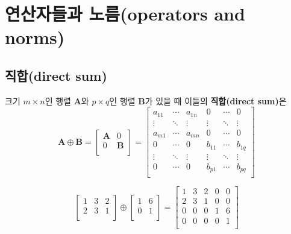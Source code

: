 \documentclass[b5paper,]{scrbook}
\theoremstyle{plain}
\theoremstyle{definition}
\numberwithin{equation}{section}
\let\BeginKnitrBlock\begin \let\EndKnitrBlock\end
\begin{document}
\section{연산자들과 노름(operators and
norms)}\label{-operators-and-norms}

\subsection{직합(direct sum)}\label{direct-sum}

\BeginKnitrBlock{definition}[직합]
\protect\hypertarget{def:unnamed-chunk-2}{}{\label{def:unnamed-chunk-2}
{} }크기 \(m \times n\)인 행렬 \(\mathbf{A}\)와
\(p\times q\)인 행렬 \(\mathbf{B}\)가 있을 때 이들의 \textbf{직합(direct
sum)}은 \[\mathbf{A}\oplus\mathbf{B}=
\begin{bmatrix}
\mathbf{A} & 0\\
0 & \mathbf{B}\\
\end{bmatrix}
=
\begin{bmatrix}
a_{11} & \cdots & a_{1n} & 0 & \cdots & 0 \\
\vdots & \ddots & \vdots & \vdots & \ddots & \vdots \\
a_{m1} & \cdots & a_{mn} & 0 & \cdots & 0 \\
0 & \cdots & 0 & b_{11} & \cdots & b_{1q} \\
\vdots & \ddots & \vdots & \vdots & \ddots & \vdots \\
0 & \cdots & 0 & b_{p1} & \cdots & b_{pq} \\
\end{bmatrix}
\]
\EndKnitrBlock{definition}

\BeginKnitrBlock{example}[직합의 예]
\protect\hypertarget{exm:unnamed-chunk-3}{}{\label{exm:unnamed-chunk-3}
{} }\[
\begin{bmatrix}
1 & 3 & 2\\
2 & 3 & 1\\
\end{bmatrix}
\oplus
\begin{bmatrix}
1 & 6\\
0 & 1\\
\end{bmatrix}
=
\begin{bmatrix}
1 & 3 & 2 & 0 & 0\\
2 & 3 & 1 & 0 & 0\\
0 & 0 & 0 & 1 & 6\\
0 & 0 & 0 & 0 & 1\\
\end{bmatrix}
\]
\EndKnitrBlock{example}
\end{document}
